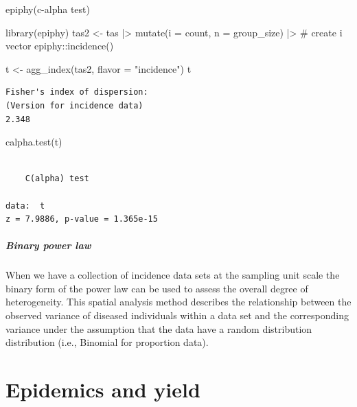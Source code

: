 \documentclass[
  letterpaper,
  DIV=11,
  numbers=noendperiod]{scrreprt}
\newenvironment{Shaded}{\begin{snugshade}}{\end{snugshade}}
\newcommand{\AttributeTok}[1]{\textcolor[rgb]{0.40,0.45,0.13}{#1}}
\newcommand{\CommentTok}[1]{\textcolor[rgb]{0.37,0.37,0.37}{#1}}
\newcommand{\FunctionTok}[1]{\textcolor[rgb]{0.28,0.35,0.67}{#1}}
\newcommand{\NormalTok}[1]{\textcolor[rgb]{0.00,0.23,0.31}{#1}}
\newcommand{\OtherTok}[1]{\textcolor[rgb]{0.00,0.23,0.31}{#1}}
\newcommand{\SpecialCharTok}[1]{\textcolor[rgb]{0.37,0.37,0.37}{#1}}
\newcommand{\StringTok}[1]{\textcolor[rgb]{0.13,0.47,0.30}{#1}}
\begin{document}
epiphy(c-alpha test)

\begin{Shaded}
\begin{Highlighting}[]
\FunctionTok{library}\NormalTok{(epiphy)}
\NormalTok{tas2 }\OtherTok{\textless{}{-}}\NormalTok{ tas }\SpecialCharTok{|\textgreater{}}
  \FunctionTok{mutate}\NormalTok{(}\AttributeTok{i =}\NormalTok{ count,}
         \AttributeTok{n =}\NormalTok{ group\_size) }\SpecialCharTok{|\textgreater{}}  \CommentTok{\# create i vector}
\NormalTok{  epiphy}\SpecialCharTok{::}\FunctionTok{incidence}\NormalTok{()}

\NormalTok{t }\OtherTok{\textless{}{-}} \FunctionTok{agg\_index}\NormalTok{(tas2, }\AttributeTok{flavor =} \StringTok{"incidence"}\NormalTok{)}
\NormalTok{t}
\end{Highlighting}
\end{Shaded}

\begin{verbatim}
Fisher's index of dispersion:
(Version for incidence data)
2.348
\end{verbatim}

\begin{Shaded}
\begin{Highlighting}[]
\FunctionTok{calpha.test}\NormalTok{(t)}
\end{Highlighting}
\end{Shaded}

\begin{verbatim}

    C(alpha) test

data:  t
z = 7.9886, p-value = 1.365e-15
\end{verbatim}

\hypertarget{binary-power-law}{%
\subsubsection{Binary power law}\label{binary-power-law}}

When we have a collection of incidence data sets at the sampling unit
scale the binary form of the power law can be used to assess the overall
degree of heterogeneity. This spatial analysis method describes the
relationship between the observed variance of diseased individuals
within a data set and the corresponding variance under the assumption
that the data have a random distribution distribution (i.e., Binomial
for proportion data).

\part{Epidemics and yield}
\end{document}
